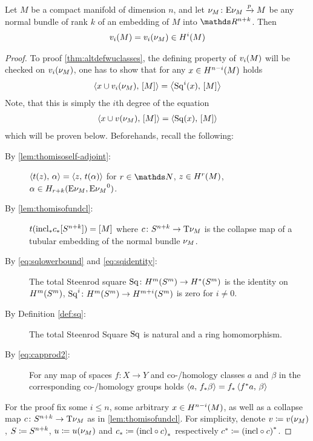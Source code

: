 \begin{Thm}\label{thm:altdefwuclasses}
  Let $M$ be a compact manifold of dimension $n$, and let
  $\nu_{M}\colon \mathrm{E}\nu_{M} \xrightarrow{p} M$ be
  any normal bundle of rank $k$ of an embedding of $M$ into
  $\R^{n+k}$. Then
  \begin{gather*}
    {v_{i}}(M) = {v_{i}}(\nu_{M})\in H^i(M)
  \end{gather*}
  \begin{proof}
    To proof \autoref{thm:altdefwuclasses}, the defining property of
    ${v_{i}}(M)$ will be checked on ${v_{i}}(\nu_{M})$, \idest one has to show
    that for any $x\in H^{n-i}(M)$ holds
    \begin{gather*}
      \left\langle x\cup {v_{i}}(\nu_{M}),\, [M] \right\rangle
      = \left\langle \mathrm{Sq}^{i}(x),\, [M] \right\rangle
    \end{gather*}
    Note, that this is simply the $i$th degree of the equation
    \begin{gather}\label{eq:proofaltdefwuclasses:claim}
      \left\langle x\cup {v_{}}(\nu_{M}),\, [M] \right\rangle
      = \left\langle \mathrm{Sq}(x),\, [M] \right\rangle
    \end{gather}
    which will be proven below.
    Beforehands, recall the following:
    \begin{description}
    \item[By \autoref{lem:thomisoself-adjoint}:]
      $\left\langle t(z),\, \alpha \right\rangle = \left\langle z,\, t(\alpha) \right\rangle$
      for $r\in\Nat$, $z\in H^r(M)$,
      $\alpha\in H_{r+k}(\mathrm{E}\nu_{M}, {\mathrm{E}\nu_{M}}^0)$.
    \item[By \autoref{lem:thomisofundcl}:]
      $t({\mathrm{incl}}_*{c}_*[S^{n+k}]) = [M]$
      where $c\colon S^{n+k}\to \mathrm{T}{\nu_{M}}$ is
      the collapse map of a tubular embedding of the normal bundle $\nu_{M}$.
    \item[By \eqref{eq:sqlowerbound} and \eqref{eq:sqidentity}:]
      The total Steenrod square
      $\mathrm{Sq}\colon H^m(S^{m})
      \to H^*(S^{m})$
      is the identity on $H^m(S^{m})$, \idest
      $\mathrm{Sq}^{i}\colon H^m(S^{m})\to H^{m+i}(S^{m})$ is zero for
      $i\neq0$.
    \item[By Definition \autoref{def:sq}:] The total Steenrod Square
      $\mathrm{Sq}$ is natural and a ring homomorphism.
    \item[By \eqref{eq:capprod2}:]
      For any map of spaces $f\colon X\to Y$ and co-/homology classes
      $a$ and $\beta$ in the corresponding co-/homology groups holds
      $\left\langle a,\, {f}_* \beta \right\rangle = {f}_* \left\langle {f}^* a,\, \beta \right\rangle$
    \end{description}
    For the proof fix some $i\leq n$, some arbitrary $x\in
    H^{n-i}(M)$, as well as a collapse map
    $c\colon S^{n+k}\to\mathrm{T}{\nu_{M}}$ as in
    \autoref{lem:thomisofundcl}.
    For simplicity, denote
    $v\coloneqq {v_{}}(\nu_{M})$,
    $S\coloneqq S^{n+k}$,
    $u\coloneqq {u}(\nu_{M})$ and
    ${c}_*\coloneqq {(\mathrm{incl}\circ c)}_*$
    respectively
    ${c}^*\coloneqq {(\mathrm{incl}\circ c)}^*$.
    

\end{proof}
\end{Thm}
